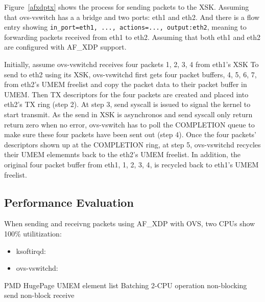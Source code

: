\documentclass[10pt]{sigplanconf}
\newcommand{\mycomment}[1]{}
\begin{document}
Figure~\ref{afxdptx} shows the process for sending packets to the XSK.
Assuming that ovs-vswitch has a a bridge and two ports: eth1 and eth2.
And there is a flow entry showing
\texttt{in\_port=eth1, ..., actions=..., output:eth2}, meaning to forwarding
packets received from eth1 to eth2.
Assuming that both eth1 and eth2 are configured with AF\_XDP support.

Initially, assume ovs-vswitchd receives four packets {1, 2, 3, 4} from eth1's XSK
To send to eth2 using its XSK, ovs-vswitchd first gets four packet buffers,
{4, 5, 6, 7}, from eth2's UMEM freelist and copy the packet data to their
packet buffer in UMEM.  Then TX descriptors for the four packets are
created and placed into eth2's TX ring (step 2).
At step 3, send syscall is issued to signal the kernel to start transmit.
As the send in XSK is asynchronos and send syscall only return return zero when
no error, ovs-vswitch has to poll the COMPLETION queue to make sure these four
packets have been sent out (step 4).
Once the four packets' descriptors shown up at the COMPLETION ring, at step 5,
ovs-vswitchd recycles their UMEM elememnts back to the eth2's UMEM freelist.
In addition, the original four packet buffer from eth1, {1, 2, 3, 4}, is
recycled back to eth1's UMEM freelist.

\subsection{Performance Evaluation}
When sending and receivng packets using AF\_XDP with OVS, two CPUs show
100\% utilitization:
\begin{itemize}
\item ksoftirqd:
\item ovs-vswitchd:
\end{itemize}
PMD
HugePage
UMEM element list
Batching
2-CPU operation
non-blocking send
non-block receive

\mycomment{
/* PMD: Poll modes drivers.  PMD accesses devices via polling to eliminate
 * the performance overhead of interrupt processing.  Therefore netdev can
 * not implement rx-wait for these devices.  dpif-netdev needs to poll
 * these device to check for recv buffer.  pmd-thread does polling for
 * devices assigned to itself.
 *
 * DPDK used PMD for accessing NIC.
 *}




\end{document}

